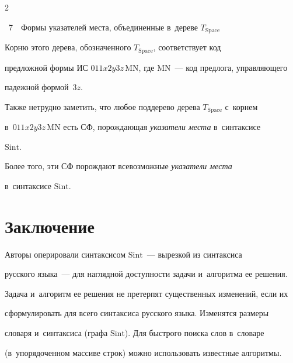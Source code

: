 \begin{multicols}{2}
{{{\figurename~7}\ \ \small{Формы указателей места, объединенные в~дереве $T_{\mathrm{Space}}$}}


}


    


    \vspace*{12pt}





    


     


     Корню этого дерева, обозначенного $T_{\mathrm{Space}}$, соответствует код 


предложной формы ИС $011x2y3z\,\mathrm{MN}$, где $\mathrm{MN}$~--- код предлога, управ\-ля\-юще\-го 


падежной формой~$3z$.


     


     Также нетрудно заметить, что любое поддерево дерева $T_{\mathrm{Space}}$ с~корнем 


в~$011x2y3z\,\mathrm{MN}$ есть СФ, порождающая \textit{указатели места} в~синтаксисе 


$\mathrm{Sint}$. 


     


     Более того, эти СФ порождают все\-воз\-мож\-ные \textit{указатели места} 


в~синтаксисе $\mathrm{Sint}$. 


     


\section{Заключение}





Авторы оперировали синтаксисом $\mathrm{Sint}$~--- вырезкой из синтаксиса 


русского языка~--- для наглядной доступности задачи и~алгоритма ее решения. 


Задача и~алгоритм ее решения не претерпят существенных изменений, если их 


сформулировать для всего синтаксиса русского языка. Изменятся размеры 


словаря и~синтаксиса (графа $\mathrm{Sint}$). Для быстрого поиска слов в~словаре 


(в~упорядоченном массиве строк) можно использовать известные ал\-го\-ритмы.



\end{multicols}
